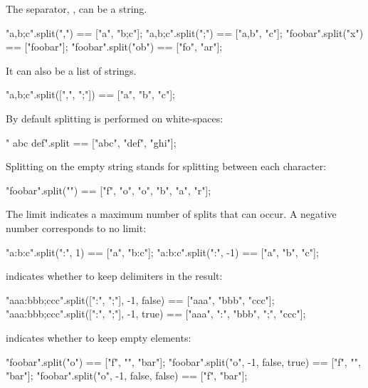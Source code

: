 \begin{urbiscriptapi}
  The separator, , can be a string.

\begin{urbiassert}
       "a,b;c".split(",") == ["a", "b;c"];
       "a,b;c".split(";") == ["a,b", "c"];
      "foobar".split("x") == ["foobar"];
     "foobar".split("ob") == ["fo", "ar"];
\end{urbiassert}

\noindent
It can also be a list of strings.

\begin{urbiassert}
"a,b;c".split([",", ";"]) == ["a", "b", "c"];
\end{urbiassert}

\noindent
By default splitting is performed on white-spaces:

\begin{urbiassert}
"  abc  def\tghi\n".split == ["abc", "def", "ghi"];
\end{urbiassert}

\noindent
Splitting on the empty string stands for splitting between each character:

\begin{urbiassert}
"foobar".split("") == ["f", "o", "o", "b", "a", "r"];
\end{urbiassert}

The limit  indicates a maximum number of splits that can occur. A
negative number corresponds to no limit:

\begin{urbiassert}
"a:b:c".split(":",  1) == ["a", "b:c"];
"a:b:c".split(":", -1) == ["a", "b", "c"];
\end{urbiassert}

 indicates whether to keep delimiters in the result:

\begin{urbiassert}
"aaa:bbb;ccc".split([":", ";"], -1, false) == ["aaa",      "bbb",      "ccc"];
"aaa:bbb;ccc".split([":", ";"], -1, true)  == ["aaa", ":", "bbb", ";", "ccc"];
\end{urbiassert}

 indicates whether to keep empty elements:

\begin{urbiassert}
"foobar".split("o")                   == ["f", "", "bar"];
"foobar".split("o", -1, false, true)  == ["f", "", "bar"];
"foobar".split("o", -1, false, false) == ["f",     "bar"];
\end{urbiassert}
\end{urbiscriptapi}


